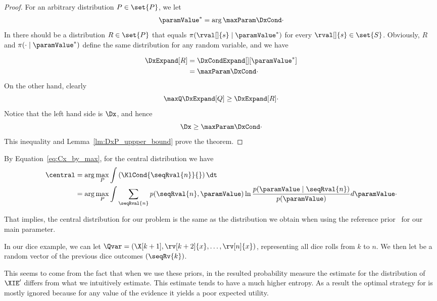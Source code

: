 \begin{proof}
    For an arbitrary distribution $P \in \set{P}$, we let
    \[
        \paramValue^* = \arg\maxParam \DxCond \cdot
    \]
    In \Mt there should be a distribution $R \in \set{P}$ that equals $\pi(\rval[]{s} \mid \paramValue^*)$
    for every $\rval[]{s} \in \set{S}$.
    Obviously, $R$ and $\pi(\cdot \mid \paramValue^*)$ define the same distribution for any random variable,
    and we have

    \begin{align*}
        \DxExpand[R] &= \DxCondExpand[][\paramValue^*] \\
        &= \maxParam \DxCond \cdot
    \end{align*}
    On the other hand, clearly
    \[
        \maxQ \DxExpand[Q] \geq \DxExpand[R] \cdot
    \]
    Notice that the left hand side is $\Dx$, and hence
    \[
        \Dx \geq \maxParam \DxCond \cdot
    \]
    This inequality and Lemma~\ref{lm:DxP_uppper_bound} prove the theorem.
\end{proof}
















By Equation~\ref{eq:Cx_by_max}, for the central distribution we have
\begin{align*}
    \central &= \arg\max_{P} \int \left(\KlCond{\seqRval{n}}{}\right) \dt \\
    &= \arg\max_{P} \int \sum_{\seqRval{n}} p(\seqRval{n}, \paramValue) \ln
    \frac{p(\paramValue \mid \seqRval{n})}{p(\paramValue)} d\paramValue \cdot
\end{align*}

That implies, the central distribution for our problem is the same as the distribution we obtain when using the
reference prior~\cite{BERNARDO200517} for our main parameter.



In our dice example, we can let $\Qvar = (\X[k+1], \rv[k+2]{x}, \dots, \rv[n]{x})$, representing all
dice rolls from $k$ to $n$.
We then let  be a random vector of the previous dice outcomes $(\seqRv{k})$.

This seems to come from the fact that when we use these priors, in the resulted probability measure the estimate for
the distribution of $\XIE'$ differs from what we intuitively estimate.
This estimate tends to have a much higher entropy.
As a result the optimal strategy for  is mostly ignored because for any value of the evidence it yields a
poor expected utility.

